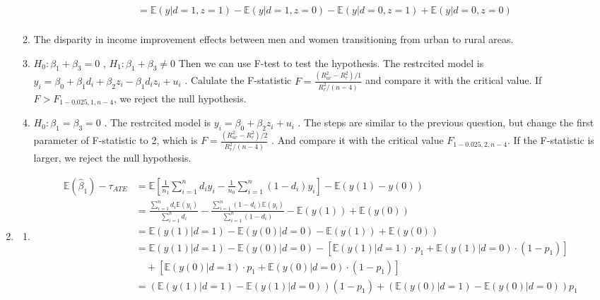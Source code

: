 \documentclass{article}
\begin{document}
\begin{enumerate}
\begin{enumerate}
\begin{equation}
\begin{aligned}
                &=\mathbb{E}(y|d=1,z=1)-\mathbb{E}(y|d=1,z=0)-\mathbb{E}(y|d=0,z=1)+\mathbb{E}(y|d=0,z=0) \\
            \end{aligned}
            \nonumber
        \end{equation}
        \item The disparity in income improvement effects between men and women transitioning from urban to rural areas.
        \item $H_0: \beta_1+\beta_3=0$ , $H_1: \beta_1+\beta_3\neq0$
        Then we can use F-test to test the hypothesis.
        The restrcited model is $y_i=\beta_0+\beta_1d_i+\beta_2z_i-\beta_1d_iz_i+u_i$ .
        Calulate the F-statistic $F=\frac{(R_{ur}^2-R_r^2)/1}{R_r^2/(n-4)}$ and compare it with the critical value. 
        If $F>F_{1-0.025,1,n-4}$, we reject the null hypothesis.
        \item $H_0: \beta_1=\beta_3=0$ . 
        The restrcited model is $y_i=\beta_0+\beta_2z_i+u_i$ .
        The steps are similar to the previous question, but change the first parameter of F-statistic to 2,
        which is $F=\frac{(R_{ur}^2-R_r^2)/2}{R_r^2/(n-4)}$ . And compare it with the critical value $F_{1-0.025,2,n-4}$.
        If the F-statistic is larger, we reject the null hypothesis.
    \end{enumerate}
    \item \begin{enumerate}
        \item \begin{equation}
            \begin{aligned}
                \mathbb{E}(\hat{\beta}_1)-\tau_{ATE}
                &=\mathbb{E}\left[\frac{1}{n_1}\sum_{i=1}^{n}d_iy_i-\frac{1}{n_0}\sum_{i=1}^{n}(1-d_i)y_i\right]-\mathbb{E}(y(1)-y(0)) \\
                &=\frac{\sum_{i=1}^{n}d_i\mathbb{E}(y_i)}{\sum_{i=1}^{n}d_i}-\frac{\sum_{i=1}^{n}(1-d_i)\mathbb{E}(y_i)}{\sum_{i=1}^{n}(1-d_i)}-\mathbb{E}(y(1))+\mathbb{E}(y(0)) \\
                &=\mathbb{E}(y(1)|d=1)-\mathbb{E}(y(0)|d=0)-\mathbb{E}(y(1))+\mathbb{E}(y(0)) \\
                &=\mathbb{E}(y(1)|d=1)-\mathbb{E}(y(0)|d=0)-[\mathbb{E}(y(1)|d=1)\cdot p_1+\mathbb{E}(y(1)|d=0)\cdot (1-p_1)] \\
                &\quad+[\mathbb{E}(y(0)|d=1)\cdot p_1+\mathbb{E}(y(0)|d=0)\cdot (1-p_1)] \\
                &=\left(\mathbb{E}(y(1)|d=1)-\mathbb{E}(y(1)|d=0)\right)(1-p_1)+\left(\mathbb{E}(y(0)|d=1)-\mathbb{E}(y(0)|d=0)\right)p_1 \\

\end{aligned}
\end{equation}
\end{enumerate}
\end{enumerate}
\end{document}
